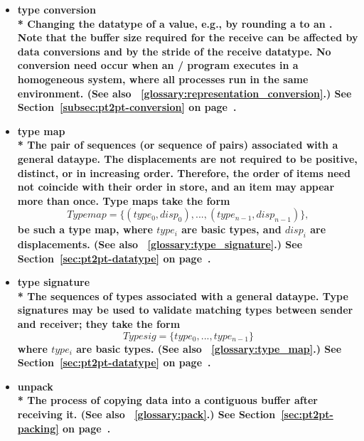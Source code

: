 \begin{itemize}
\label{glossary:type_conversion}
\item \bf{ type conversion} \\*
Changing the datatype of a value, e.g., by rounding a
 to an . Note that the buffer size required for the receive can be affected by data conversions and
by the stride of the receive datatype. No conversion need occur when an \MPI/ program executes in
a homogeneous system, where all processes run in the same environment. (See also ~\ref{glossary:representation_conversion}.)
See Section~\ref{subsec:pt2pt-conversion} on page~\pageref{subsec:pt2pt-conversion}.


\label{glossary:type_map}
\item \bf{ type map} \\*
The pair of sequences (or sequence of pairs) associated with a general dataype.
The displacements are not required to be positive, distinct, or
in increasing order. Therefore, the order of items need not
coincide with their order in store, and an item may appear more than
once. Type maps take the form
\[
Typemap = \{ (type_0,disp_0), ..., (type_{n-1}, disp_{n-1}) \} ,
\]
be such a type map, where $type_i$ are basic types, and
$disp_i$ are  displacements.
(See also ~\ref{glossary:type_signature}.)
See Section~\ref{sec:pt2pt-datatype} on page~\pageref{sec:pt2pt-datatype}.

\label{glossary:type_signature}
\item \bf{ type signature} \\*
The sequences of types associated with a general dataype.
Type signatures may be used to validate matching types between sender and receiver; they take the form
\[
Typesig = \{ type_0 , ... , type_{n-1} \}
\]
where $type_i$ are basic types.
(See also ~\ref{glossary:type_map}.)
See Section~\ref{sec:pt2pt-datatype} on page~\pageref{sec:pt2pt-datatype}.

\label{glossary:unpack}
\item \bf{ unpack} \\*
The process of copying data into a contiguous buffer
after receiving it. (See also ~\ref{glossary:pack}.)
See Section~\ref{sec:pt2pt-packing} on page~\pageref{sec:pt2pt-packing}.


\end{itemize}
